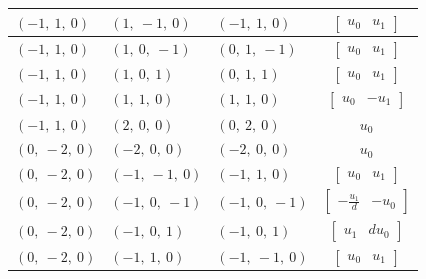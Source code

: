 \documentclass[11pt]{article}
\theoremstyle{definition}
\begin{document}
\begin{longtable}{|l|l|l|c|}
    \hline
    $\left( -1, \  1, \  0\right)$ & $\left( 1, \  -1, \  0\right)$ & $\left( -1, \  1, \  0\right)$ & $\left[\begin{matrix}u_{0} & u_{1}\end{matrix}\right]$ \\
    \hline
    $\left( -1, \  1, \  0\right)$ & $\left( 1, \  0, \  -1\right)$ & $\left( 0, \  1, \  -1\right)$ & $\left[\begin{matrix}u_{0} & u_{1}\end{matrix}\right]$ \\
    \hline
    $\left( -1, \  1, \  0\right)$ & $\left( 1, \  0, \  1\right)$ & $\left( 0, \  1, \  1\right)$ & $\left[\begin{matrix}u_{0} & u_{1}\end{matrix}\right]$ \\
    \hline
    $\left( -1, \  1, \  0\right)$ & $\left( 1, \  1, \  0\right)$ & $\left( 1, \  1, \  0\right)$ & $\left[\begin{matrix}u_{0} & - u_{1}\end{matrix}\right]$ \\
    \hline
    $\left( -1, \  1, \  0\right)$ & $\left( 2, \  0, \  0\right)$ & $\left( 0, \  2, \  0\right)$ & $u_{0}$ \\
    \hline
    $\left( 0, \  -2, \  0\right)$ & $\left( -2, \  0, \  0\right)$ & $\left( -2, \  0, \  0\right)$ & $u_{0}$ \\
    \hline
    $\left( 0, \  -2, \  0\right)$ & $\left( -1, \  -1, \  0\right)$ & $\left( -1, \  1, \  0\right)$ & $\left[\begin{matrix}u_{0} & u_{1}\end{matrix}\right]$ \\
    \hline
    $\left( 0, \  -2, \  0\right)$ & $\left( -1, \  0, \  -1\right)$ & $\left( -1, \  0, \  -1\right)$ & $\left[\begin{matrix}- \frac{u_{1}}{d} & - u_{0}\end{matrix}\right]$ \\
    \hline
    $\left( 0, \  -2, \  0\right)$ & $\left( -1, \  0, \  1\right)$ & $\left( -1, \  0, \  1\right)$ & $\left[\begin{matrix}u_{1} & d u_{0}\end{matrix}\right]$ \\
    \hline
    $\left( 0, \  -2, \  0\right)$ & $\left( -1, \  1, \  0\right)$ & $\left( -1, \  -1, \  0\right)$ & $\left[\begin{matrix}u_{0} & u_{1}\end{matrix}\right]$ \\

\end{longtable}
\end{document}
